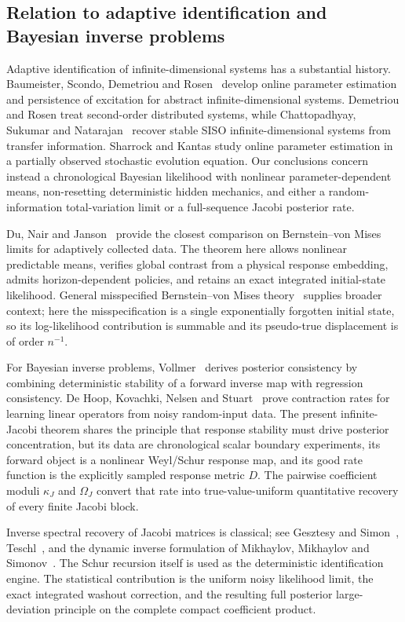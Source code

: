 \subsection{Relation to adaptive identification and Bayesian inverse problems}
\label{sec:literature}

Adaptive identification of infinite-dimensional systems has a substantial
history.  Baumeister, Scondo, Demetriou and Rosen~\cite{Baumeister1997} develop
online parameter estimation and persistence of excitation for abstract
infinite-dimensional systems.  Demetriou and Rosen
\cite{DemetriouRosen1994Inverse,DemetriouRosen1994PE} treat second-order
distributed systems, while Chattopadhyay, Sukumar and
Natarajan~\cite{Chattopadhyay2025} recover stable SISO infinite-dimensional
systems from transfer information.  Sharrock and Kantas
\cite{SharrockKantas2022} study online parameter estimation in a partially
observed stochastic evolution equation.  Our conclusions concern instead a
chronological Bayesian likelihood with nonlinear parameter-dependent means,
non-resetting deterministic hidden mechanics, and either a random-information
total-variation limit or a full-sequence Jacobi posterior rate.

Du, Nair and Janson~\cite{DuNairJanson2025} provide the closest comparison on
Bernstein--von Mises limits for adaptively collected data.  The theorem here
allows nonlinear predictable means, verifies global contrast from a physical
response embedding, admits horizon-dependent policies, and retains an exact
integrated initial-state likelihood.  General misspecified Bernstein--von
Mises theory~\cite{KleijnVanDerVaart2012} supplies broader context; here the
misspecification is a single exponentially forgotten initial state, so its
log-likelihood contribution is summable and its pseudo-true displacement is
of order \(n^{-1}\).

For Bayesian inverse problems, Vollmer~\cite{Vollmer2013} derives posterior
consistency by combining deterministic stability of a forward inverse map
with regression consistency.  De Hoop, Kovachki, Nelsen and
Stuart~\cite{deHoopEtAl2023} prove contraction rates for learning linear
operators from noisy random-input data.  The present infinite-Jacobi theorem
shares the principle that response stability must drive posterior
concentration, but its data are chronological scalar boundary experiments,
its forward object is a nonlinear Weyl/Schur response map, and its good rate
function is the explicitly sampled response metric \(D\).  The pairwise
coefficient moduli \(\kappa_J\) and \(\Omega_J\) convert that rate into
true-value-uniform quantitative recovery of every finite Jacobi block.

Inverse spectral recovery of Jacobi matrices is classical; see Gesztesy and
Simon~\cite{GesztesySimon1997}, Teschl~\cite{Teschl2000}, and the dynamic
inverse formulation of Mikhaylov, Mikhaylov and
Simonov~\cite{Mikhaylov2019}.  The Schur recursion itself is used as the
deterministic identification engine.  The statistical contribution is the
uniform noisy likelihood limit, the exact integrated washout correction, and
the resulting full posterior large-deviation principle on the complete
compact coefficient product.
